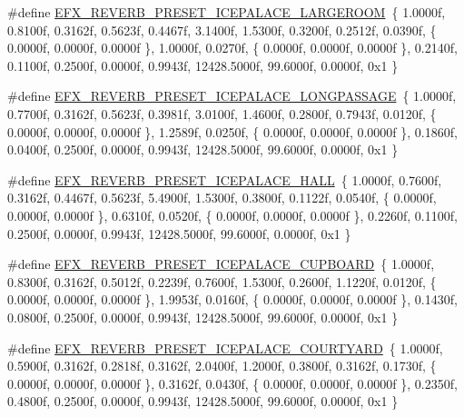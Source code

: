 \begin{DoxyCompactItemize}
\item 
\#define \hyperlink{efx-presets_8h_a0d680e53a7ff44ba5ec86768e065f2d0}{E\+F\+X\+\_\+\+R\+E\+V\+E\+R\+B\+\_\+\+P\+R\+E\+S\+E\+T\+\_\+\+I\+C\+E\+P\+A\+L\+A\+C\+E\+\_\+\+L\+A\+R\+G\+E\+R\+O\+OM}~\{ 1.\+0000f, 0.\+8100f, 0.\+3162f, 0.\+5623f, 0.\+4467f, 3.\+1400f, 1.\+5300f, 0.\+3200f, 0.\+2512f, 0.\+0390f, \{ 0.\+0000f, 0.\+0000f, 0.\+0000f \}, 1.\+0000f, 0.\+0270f, \{ 0.\+0000f, 0.\+0000f, 0.\+0000f \}, 0.\+2140f, 0.\+1100f, 0.\+2500f, 0.\+0000f, 0.\+9943f, 12428.\+5000f, 99.\+6000f, 0.\+0000f, 0x1 \}
\item 
\#define \hyperlink{efx-presets_8h_aeea083a21bc57d1d7ecc3563b6286209}{E\+F\+X\+\_\+\+R\+E\+V\+E\+R\+B\+\_\+\+P\+R\+E\+S\+E\+T\+\_\+\+I\+C\+E\+P\+A\+L\+A\+C\+E\+\_\+\+L\+O\+N\+G\+P\+A\+S\+S\+A\+GE}~\{ 1.\+0000f, 0.\+7700f, 0.\+3162f, 0.\+5623f, 0.\+3981f, 3.\+0100f, 1.\+4600f, 0.\+2800f, 0.\+7943f, 0.\+0120f, \{ 0.\+0000f, 0.\+0000f, 0.\+0000f \}, 1.\+2589f, 0.\+0250f, \{ 0.\+0000f, 0.\+0000f, 0.\+0000f \}, 0.\+1860f, 0.\+0400f, 0.\+2500f, 0.\+0000f, 0.\+9943f, 12428.\+5000f, 99.\+6000f, 0.\+0000f, 0x1 \}
\item 
\#define \hyperlink{efx-presets_8h_aa9cd072f8d0b155aba5a3fbeb11acfc4}{E\+F\+X\+\_\+\+R\+E\+V\+E\+R\+B\+\_\+\+P\+R\+E\+S\+E\+T\+\_\+\+I\+C\+E\+P\+A\+L\+A\+C\+E\+\_\+\+H\+A\+LL}~\{ 1.\+0000f, 0.\+7600f, 0.\+3162f, 0.\+4467f, 0.\+5623f, 5.\+4900f, 1.\+5300f, 0.\+3800f, 0.\+1122f, 0.\+0540f, \{ 0.\+0000f, 0.\+0000f, 0.\+0000f \}, 0.\+6310f, 0.\+0520f, \{ 0.\+0000f, 0.\+0000f, 0.\+0000f \}, 0.\+2260f, 0.\+1100f, 0.\+2500f, 0.\+0000f, 0.\+9943f, 12428.\+5000f, 99.\+6000f, 0.\+0000f, 0x1 \}
\item 
\#define \hyperlink{efx-presets_8h_a8d2347d94396aaab88765c1129f51e19}{E\+F\+X\+\_\+\+R\+E\+V\+E\+R\+B\+\_\+\+P\+R\+E\+S\+E\+T\+\_\+\+I\+C\+E\+P\+A\+L\+A\+C\+E\+\_\+\+C\+U\+P\+B\+O\+A\+RD}~\{ 1.\+0000f, 0.\+8300f, 0.\+3162f, 0.\+5012f, 0.\+2239f, 0.\+7600f, 1.\+5300f, 0.\+2600f, 1.\+1220f, 0.\+0120f, \{ 0.\+0000f, 0.\+0000f, 0.\+0000f \}, 1.\+9953f, 0.\+0160f, \{ 0.\+0000f, 0.\+0000f, 0.\+0000f \}, 0.\+1430f, 0.\+0800f, 0.\+2500f, 0.\+0000f, 0.\+9943f, 12428.\+5000f, 99.\+6000f, 0.\+0000f, 0x1 \}
\item 
\#define \hyperlink{efx-presets_8h_a4f06e2e425b3cefc3300fdef1100a739}{E\+F\+X\+\_\+\+R\+E\+V\+E\+R\+B\+\_\+\+P\+R\+E\+S\+E\+T\+\_\+\+I\+C\+E\+P\+A\+L\+A\+C\+E\+\_\+\+C\+O\+U\+R\+T\+Y\+A\+RD}~\{ 1.\+0000f, 0.\+5900f, 0.\+3162f, 0.\+2818f, 0.\+3162f, 2.\+0400f, 1.\+2000f, 0.\+3800f, 0.\+3162f, 0.\+1730f, \{ 0.\+0000f, 0.\+0000f, 0.\+0000f \}, 0.\+3162f, 0.\+0430f, \{ 0.\+0000f, 0.\+0000f, 0.\+0000f \}, 0.\+2350f, 0.\+4800f, 0.\+2500f, 0.\+0000f, 0.\+9943f, 12428.\+5000f, 99.\+6000f, 0.\+0000f, 0x1 \}

\end{DoxyCompactItemize}
